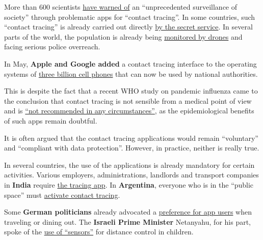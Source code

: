 More than 600 scientists
\href{https://www.esat.kuleuven.be/cosic/sites/contact-tracing-joint-statement/}{have
warned of} an ``unprecedented surveillance of society'' through
problematic apps for ``contact tracing''. In some countries, such
``contact tracing'' is already carried out directly
\href{https://www.jewishpress.com/news/the-courts/state-to-high-court-even-more-shin-bet-involvement-in-fighting-the-coronavirus/2020/04/14/}{by
the secret service}. In several parts of the world, the population is
already being
\href{https://off-guardian.org/2020/04/25/50-headlines-darker-more-of-the-new-normal/}{monitored
by drones} and facing serious police overreach.

In May, \textbf{Apple and Google added} a contact tracing interface to
the operating systems of
\href{https://www.bloomberg.com/news/articles/2020-04-10/apple-google-bring-covid-19-contact-tracing-to-3-billion-people}{three
billion cell phones} that can now be used by national authorities.

This is despite the fact that a recent WHO study on pandemic influenza
came to the conclusion that contact tracing is not sensible from a
medical point of view and is
\href{https://apps.who.int/iris/bitstream/handle/10665/329438/9789241516839-eng.pdf}{``not
recommended in any circumstances''}, as the epidemiological benefits of
such apps remain doubtful.

It is often argued that the contact tracing applications would remain
``voluntary'' and ``compliant with data protection''. However, in
practice, neither is really true.

In several countries, the use of the applications is already mandatory
for certain activities. Various employers, administrations, landlords
and transport companies in \textbf{India} require
\href{https://www.technologyreview.com/2020/05/07/1001360/india-aarogya-setu-covid-app-mandatory/}{the
tracing app}. In \textbf{Argentina}, everyone who is in the ``public
space'' must
\href{https://www.heise.de/tp/features/CuidAR-Argentinien-ueberwacht-mit-einer-App-4720143.html}{activate
contact tracing}.

Some \textbf{German politicians} already advocated a
\href{https://www.faz.net/aktuell/politik/wer-die-corona-app-hat-soll-zuerst-wieder-ins-restaurant-duerfen-16759932.html}{preference
for app users} when traveling or dining out. The \textbf{Israeli Prime
Minister} Netanyahu, for his part, spoke of the
\href{https://norberthaering.de/die-regenten-der-welt/netanyahu-sensoren/}{use
of ``sensors''} for distance control in children.

